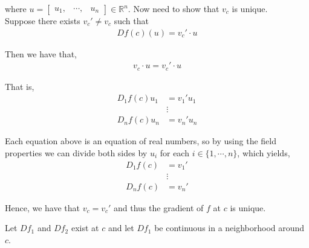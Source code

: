 \documentclass[12pt]{article}
\newenvironment{problem}[2][Problem]{\begin{trivlist}
\item[\hskip \labelsep {\bfseries #1}\hskip \labelsep {\bfseries #2.}]}{\end{trivlist}}
\begin{document}
where $u = \begin{bmatrix} u_1, & \cdots, & u_n \end{bmatrix} \in \mathbb{R}^n$. Now need to show that $v_c$ is unique.\\

Suppose there exists $v_c' \neq v_c$ such that
\begin{align*}
Df(c)(u) = v_c' \cdot u
\end{align*} 

Then we have that,
\begin{align*}
v_c \cdot u = v_c' \cdot u
\end{align*}

That is,
\begin{align*}
D_1f(c) u_1 &= v_1' u_1\\
&\vdots\\
D_nf(c) u_n &= v_n' u_n
\end{align*}

Each equation above is an equation of real numbers, so by using the field properties we can divide both sides by $u_i$ for each $i \in \{1, \cdots, n\}$, which yields,
\begin{align*}
D_1f(c) &= v_1' \\
&\vdots\\
D_nf(c) &= v_n' 
\end{align*}

Hence, we have that $v_c = v_c'$ and thus the gradient of $f$ at $c$ is unique.

\newpage
\begin{problem}{5}
\end{problem}

Let $Df_1$ and $Df_2$ exist at $c$ and let $Df_1$ be continuous in a neighborhood around $c$.
\end{document}
